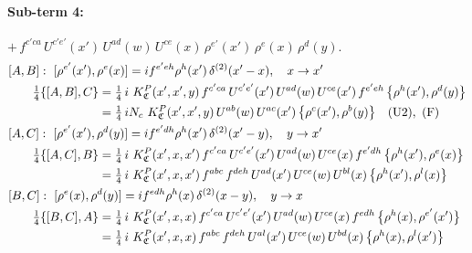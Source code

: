 \documentclass[10pt]{article}
\numberwithin{equation}{section}
\begin{document}
\paragraph{Sub-term 4:} $+\,f^{c'ca}\,U^{c'e'}(x')\,U^{ad}(w)\,U^{ce}(x)\,\rho^{e'}(x')\,\rho^{e}(x)\,\rho^{d}(y)$.
\begin{align}
&[A,B]:\ [\rho^{e'}(x'),\rho^{e}(x)]=i f^{e'eh}\rho^{h}(x')\,\delta^{(2)}(x'-x),\quad x\to x'\notag\\
&\qquad \tfrac14\{[A,B],C\}=\tfrac14\,i\,\,K^{P}_{\mathfrak C}(x',x',y)\,f^{c'ca}\,U^{c'e'}(x')\,U^{ad}(w)\,U^{ce}(x')\,f^{e'eh}\,\big\{\rho^{h}(x'),\rho^{d}(y)\big\}\notag\\
&\qquad\phantom{\tfrac14\{[A,B],C\}}=\tfrac14\,i N_{c}\,\,K^{P}_{\mathfrak C}(x',x',y)\,U^{ab}(w)\,U^{ac}(x')\,\big\{\rho^{c}(x'),\rho^{b}(y)\big\}\quad\text{(U2)},\ \text{(F)}
\label{B:eq:GIII.V.P-4-AB}\\
&[A,C]:\ [\rho^{e'}(x'),\rho^{d}(y)]=i f^{e'dh}\rho^{h}(x')\,\delta^{(2)}(x'-y),\quad y\to x'\notag\\
&\qquad \tfrac14\{[A,C],B\}=\tfrac14\,i\,\,K^{P}_{\mathfrak C}(x',x,x')\,f^{c'ca}\,U^{c'e'}(x')\,U^{ad}(w)\,U^{ce}(x)\,f^{e'dh}\,\big\{\rho^{h}(x'),\rho^{e}(x)\big\}\notag\\
&\qquad\phantom{\tfrac14\{[A,C],B\}}=\tfrac14\,i\,\,K^{P}_{\mathfrak C}(x',x,x')\,f^{abc}\,f^{deh}\,U^{ad}(x')\,U^{ce}(w)\,U^{bl}(x)\,\big\{\rho^{h}(x'),\rho^{l}(x)\big\}
\label{B:eq:GIII.V.P-4-AC}\\
&[B,C]:\ [\rho^{e}(x),\rho^{d}(y)]=i f^{edh}\rho^{h}(x)\,\delta^{(2)}(x-y),\quad y\to x\notag\\
&\qquad \tfrac14\{[B,C],A\}=\tfrac14\,i\,\,K^{P}_{\mathfrak C}(x',x,x)\,f^{c'ca}\,U^{c'e'}(x')\,U^{ad}(w)\,U^{ce}(x)\,f^{edh}\,\big\{\rho^{h}(x),\rho^{e'}(x')\big\}\notag\\
&\qquad\phantom{\tfrac14\{[B,C],A\}}=\tfrac14\,i\,\,K^{P}_{\mathfrak C}(x',x,x)\,f^{abc}\,f^{deh}\,U^{al}(x')\,U^{ce}(w)\,U^{bd}(x)\,\big\{\rho^{h}(x),\rho^{l}(x')\big\}
\label{B:eq:GIII.V.P-4-BC}
\end{align}
\end{document}
